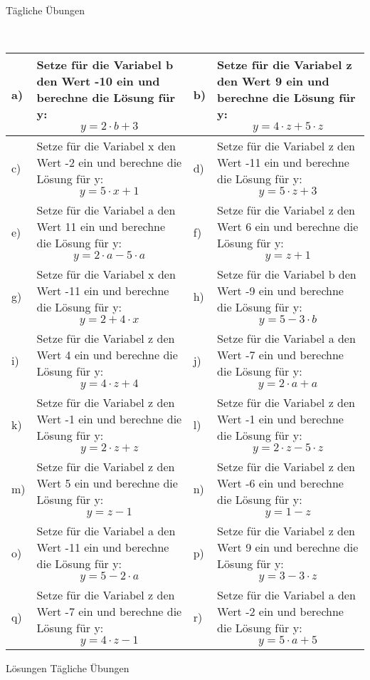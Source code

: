 \documentclass[12pt]{article}
\begin{document}
\centerline{{\Large Tägliche Übungen}} 
\vspace{1cm}
\noindent \\


\begin{xltabular}{\textwidth}{|C{0.75cm}|X|C{0.75cm}|X|}
\hline
a)&Setze für die Variabel b den Wert -10 ein und berechne die Lösung für y:$$y=2 \cdot b + 3$$
&
b)&Setze für die Variabel z den Wert 9 ein und berechne die Lösung für y:$$y=4 \cdot z + 5 \cdot z$$
\\\hline
c)&Setze für die Variabel x den Wert -2 ein und berechne die Lösung für y:$$y=5 \cdot x + 1$$
&
d)&Setze für die Variabel z den Wert -11 ein und berechne die Lösung für y:$$y=5 \cdot z + 3$$
\\\hline
e)&Setze für die Variabel a den Wert 11 ein und berechne die Lösung für y:$$y=2 \cdot a - 5 \cdot a$$
&
f)&Setze für die Variabel z den Wert 6 ein und berechne die Lösung für y:$$y=z + 1$$
\\\hline
g)&Setze für die Variabel x den Wert -11 ein und berechne die Lösung für y:$$y=2 + 4 \cdot x$$
&
h)&Setze für die Variabel b den Wert -9 ein und berechne die Lösung für y:$$y=5 - 3 \cdot b$$
\\\hline
i)&Setze für die Variabel z den Wert 4 ein und berechne die Lösung für y:$$y=4 \cdot z + 4$$
&
j)&Setze für die Variabel a den Wert -7 ein und berechne die Lösung für y:$$y=2 \cdot a + a$$
\\\hline
k)&Setze für die Variabel z den Wert -1 ein und berechne die Lösung für y:$$y=2 \cdot z + z$$
&
l)&Setze für die Variabel z den Wert -1 ein und berechne die Lösung für y:$$y=2 \cdot z - 5 \cdot z$$
\\\hline
m)&Setze für die Variabel z den Wert 5 ein und berechne die Lösung für y:$$y=z - 1$$
&
n)&Setze für die Variabel z den Wert -6 ein und berechne die Lösung für y:$$y=1 - z$$
\\\hline
o)&Setze für die Variabel a den Wert -11 ein und berechne die Lösung für y:$$y=5 - 2 \cdot a$$
&
p)&Setze für die Variabel z den Wert 9 ein und berechne die Lösung für y:$$y=3 - 3 \cdot z$$
\\\hline
q)&Setze für die Variabel z den Wert -7 ein und berechne die Lösung für y:$$y=4 \cdot z - 1$$
&
r)&Setze für die Variabel a den Wert -2 ein und berechne die Lösung für y:$$y=5 \cdot a + 5$$
\\\hline
\end{xltabular}
\vspace{0.5cm}
\newpage
{}
\centerline{{\large Lösungen Tägliche Übungen}} 
\vspace{0.5cm}
\end{document}
